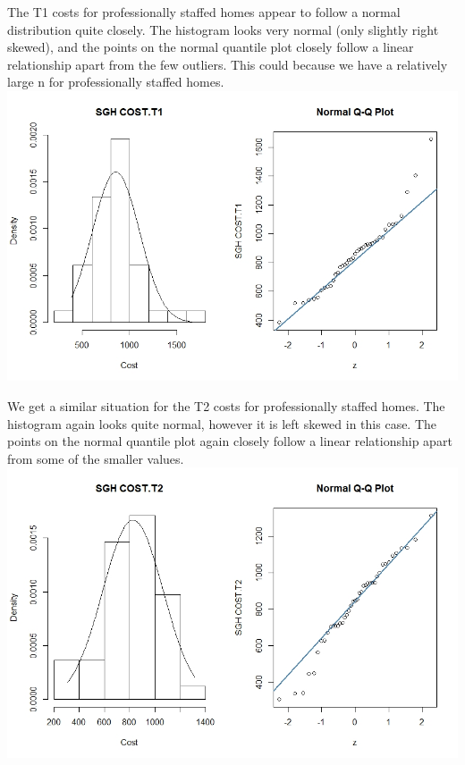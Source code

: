 \documentclass[]{article}
\begin{document}
The T1 costs for professionally staffed homes appear to follow a normal distribution quite closely. The histogram looks very normal (only slightly right skewed), and the points on the normal quantile plot closely follow a linear relationship apart from the few outliers. This could because we have a relatively large n for professionally staffed homes.
\centering
\includegraphics[width=\textwidth]{RStudio/jpeg/Norm_SGH_T1.jpeg}
\raggedright

We get a similar situation for the T2 costs for professionally staffed homes. The histogram again looks quite normal, however it is left skewed in this case. The points on the normal quantile plot again closely follow a linear relationship apart from some of the smaller values.
\centering
\includegraphics[width=\textwidth]{RStudio/jpeg/Norm_SGH_T2.jpeg}
\raggedright
\end{document}
